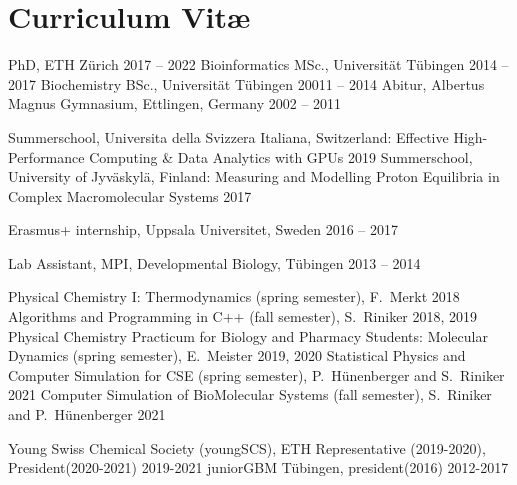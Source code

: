 \chapter{Curriculum Vit\ae}
\vspace{-1cm}
\begin{cvlist}
\end{cvlist}

\begin{cvlist}
\cventry
    {PhD, ETH Z\"{u}rich } %
    {2017 -- 2022} %
\cventry
    {Bioinformatics MSc., Universit\"{a}t T\"{u}bingen} %
    {2014 -- 2017} %
\cventry
    {Biochemistry BSc., Universit\"{a}t T\"{u}bingen} %
    {20011 -- 2014} %
\cventry
    {Abitur, Albertus Magnus Gymnasium, Ettlingen, Germany} %
    {2002 -- 2011} 
\end{cvlist}
\vspace{-0.5cm}
\begin{cvlist}
	\cventry
	{Summerschool,  Universita della Svizzera Italiana, Switzerland: Effective High-Performance Computing \& Data Analytics with GPUs} %
	{2019} %
	\cventry
	{Summerschool,  University of Jyväskylä, Finland: Measuring and Modelling Proton Equilibria in Complex Macromolecular Systems} %
	{2017} %
	
	\cventry
	{Erasmus+ internship, Uppsala Universitet, Sweden} %
	{2016 -- 2017} %
	
	\cventry
    {Lab Assistant, MPI, Developmental Biology, T\"{u}bingen} %
    {2013 -- 2014} %
\end{cvlist}
\vspace{-0.75cm}
\begin{cvlist}
	\cventry
	{Physical Chemistry I: Thermodynamics (spring semester), F.\ Merkt} %
	{2018} %
	\cventry
	{Algorithms and Programming in C++ (fall semester), S.\ Riniker} %
	{2018, 2019} %
	\cventry
	{Physical Chemistry Practicum for Biology and Pharmacy Students: Molecular Dynamics (spring semester), E.\ Meister} %
	{2019, 2020} %
	\cventry
	{Statistical Physics and Computer Simulation for CSE (spring semester), P.\ H\"unenberger and S.\ Riniker} %
	{2021} %
	\cventry
	{Computer Simulation of BioMolecular Systems (fall semester), S.\ Riniker and P.\ H\"unenberger} %
	{2021} %
\end{cvlist}
\vspace{-0.75cm}
\begin{cvlist}
	\cventry
	{Young Swiss Chemical Society (youngSCS), ETH Representative (2019-2020), President(2020-2021)} %
	{2019-2021} %
	\cventry
	{juniorGBM T\"ubingen, president(2016)} %
	{2012-2017} %
	
\end{cvlist}
